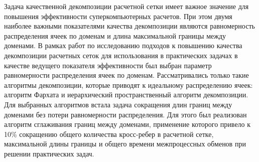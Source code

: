 Задача качественной декомпозиции расчетной сетки имеет важное значение для повышения эффективности суперкомпьютерных расчетов.
При этом двумя наиболее важными показателями качества декомпозиции являются равномерность распределения ячеек по доменам и длина максимальной границы между доменами.
В рамках работ по исследованию подходов к повышению качества декомпозиции расчетных сеток для использования в практических задачах в качестве ведущего показателя эффективности был выбран параметр равномерности распределения ячеек по доменам.
Рассматривались только такие алгоритмы декомпозиции, которые приводят к идеальному распределению ячеек: алгоритм Фархата и иерархический пространственный алгоритм декомпозиции.
Для выбранных алгоритмов встала задача сокращения длин границ между доменами без потери равномерности распределения.
Для этого был реализован алгоритм сглаживания границ между доменами, применение которого привело к 10\% сокращению общего количества кросс-ребер в расчетной сетке, максимальной длины границы и общего времени межпроцессных обменов при решении практических задач.
